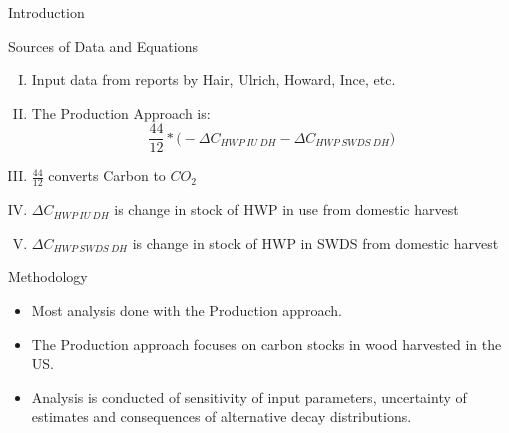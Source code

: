 \documentclass[final]{beamer}\usepackage[]{graphicx}\usepackage[]{color}
\newlength{\onecolwid}
\begin{document}
\begin{frame}[t]
\begin{columns}[t]
\begin{column}{\onecolwid}
\begin{block}{Introduction}
\end{block}


\begin{block}{Sources of Data and Equations}

\begin{enumerate}[I.]
\item Input data from reports by Hair, Ulrich, Howard, Ince, etc. 
\vspace{.3ex}
\item The Production Approach is:  
\begin{equation}
\frac{44}{12} * \Big(-\Delta C_{HWP\:IU\:DH} - \Delta C_{HWP\:SWDS\:DH}\Big)
\label{eqn:Einstein}
\end{equation}
\vspace{.3ex}
\item $\frac{44}{12}$ converts Carbon to $CO_2$
\vspace{.3ex}
\item $\Delta C_{HWP\:IU\:DH}$ is change in stock of HWP in use from 
domestic harvest 
\vspace{.3ex}
\item $\Delta C_{HWP\:SWDS\:DH}$ is change in stock of HWP in SWDS
from domestic harvest 
\end{enumerate}
\vspace{.3ex}
\end{block}
\vfill

\begin{block}{Methodology}
\begin{itemize}
\item Most analysis done with the Production approach.
\vspace{.5ex}
\item The Production approach focuses on carbon stocks in wood harvested in the US.
\vspace{.5ex}
\item Analysis is conducted of sensitivity of input parameters, uncertainty of estimates
and consequences of alternative decay distributions. 
\end{itemize}
\vspace{.3ex}
\vfill
\end{block}


\end{column}
\end{columns}
\end{frame}
\end{document}
